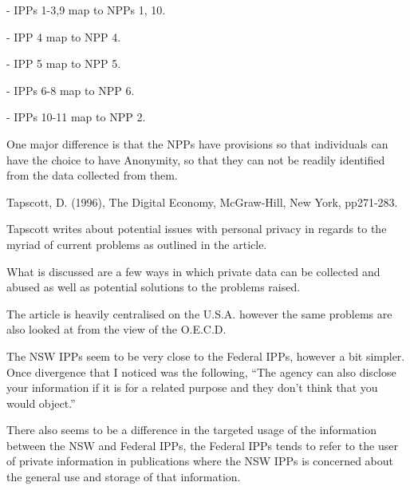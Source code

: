 
\item - IPPs 1-3,9 map to NPPs 1, 10.
\item - IPP 4 map to NPP 4.
\item - IPP 5 map to NPP 5.
\item - IPPs 6-8 map to NPP 6.
\item - IPPs 10-11 map to NPP 2.


One major difference is that the NPPs have provisions so that individuals can have the choice to have Anonymity, so that they can not be readily identified from the data collected from them.





Tapscott, D. (1996), The Digital Economy, McGraw-Hill, New York, pp271-283.


Tapscott writes about potential issues with personal privacy in regards to the myriad of current problems as outlined in the article.

What is discussed are a few ways in which private data can be collected and abused as well as potential solutions to the problems raised.

The article is heavily centralised on the U.S.A. however the same problems are also looked at from the view of the O.E.C.D.




The NSW IPPs seem to be very close to the Federal IPPs, however a bit simpler. Once divergence that I noticed was the following, ``The agency can also disclose your information if it is for a related purpose and they don't think that you would object.''


There also seems to be a difference in the targeted usage of the information between the NSW and Federal IPPs, the Federal IPPs tends to refer to the user of private information in publications where the NSW IPPs is concerned about the general use and storage of that information.

